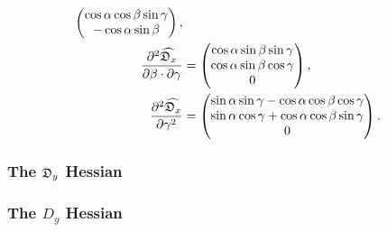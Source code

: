 \begin{subequations}
\begin{align}
\begin{pmatrix}
        \cos \alpha \cos \beta \sin \gamma \\
        -\cos \alpha \sin \beta \\
    \end{pmatrix}, \\
    \frac{\partial^2 \widehat{\mathfrak{D}_x}}{\partial \beta \cdot \partial \gamma} &= \begin{pmatrix}
        \cos \alpha \sin \beta \sin \gamma \\
        \cos \alpha \sin \beta \cos \gamma \\
        0 \\
    \end{pmatrix}, \\
    \frac{\partial^2 \widehat{\mathfrak{D}_x}}{\partial \gamma^2} &= \begin{pmatrix}
        \sin \alpha \sin \gamma - \cos \alpha \cos \beta \cos \gamma \\
        \sin \alpha \cos \gamma + \cos \alpha \cos \beta \sin \gamma \\
        0 \\
    \end{pmatrix}.
\end{align}
\end{subequations}



\begin{latexonly}
    \subsubsection{The $\mathfrak{D}_y$ Hessian}
\end{latexonly}
\begin{htmlonly}
    \subsubsection{The $D_y$ Hessian}
\end{htmlonly}


